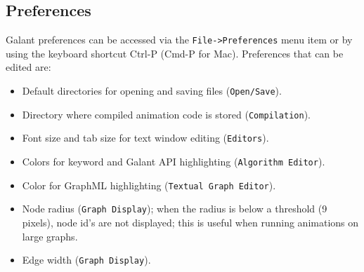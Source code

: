 \subsection{Preferences}
\label{sec:preferences}

Galant preferences can be accessed via the \texttt{File->Preferences}
menu item or by using the keyboard shortcut \textsf{Ctrl-P}
(\textsf{Cmd-P} for Mac).
Preferences that can be edited are:
\begin{itemize}
\item
Default directories for opening and saving files (\texttt{Open/Save}).
\item
Directory where compiled animation code is stored (\texttt{Compilation}).
\item
Font size and tab size for text window editing (\texttt{Editors}).
\item
Colors for keyword and Galant API highlighting (\texttt{Algorithm~Editor}).
\item
Color for GraphML highlighting (\texttt{Textual~Graph~Editor}).
\item
Node radius (\texttt{Graph~Display});
when the radius is below a threshold (9 pixels), node id's are not displayed;
this is useful when running animations on large graphs.
\item
Edge width (\texttt{Graph~Display}).
\end{itemize}


